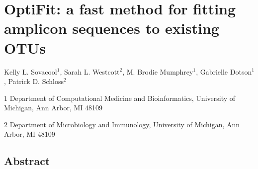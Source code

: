 \documentclass[
  11pt,
]{article}
\author{}
\date{\vspace{-2.5em}}
\begin{document}
\hypertarget{optifit-a-fast-method-for-fitting-amplicon-sequences-to-existing-otus}{%
\section{OptiFit: a fast method for fitting amplicon sequences to
existing
OTUs}\label{optifit-a-fast-method-for-fitting-amplicon-sequences-to-existing-otus}}

Kelly L. Sovacool\({^1}\), Sarah L. Westcott\({^2}\), M. Brodie
Mumphrey\({^1}\), Gabrielle Dotson\({^1}\), Patrick D. Schloss\({^2}\)

\(1\) Department of Computational Medicine and Bioinformatics,
University of Michigan, Ann Arbor, MI 48109

\(2\) Department of Microbiology and Immunology, University of Michigan,
Ann Arbor, MI 48109

\hypertarget{abstract}{%
\subsection{Abstract}\label{abstract}}
\end{document}

